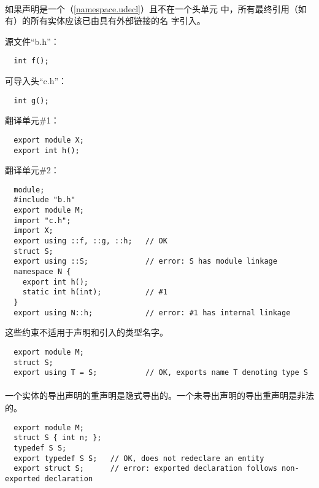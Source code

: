 \paragraph{} %
如果声明是一个（\ref{namespace.udecl}）且不在一个头单元
中，所有最终引用（如有）的所有实体应该已由具有外部链接的名
字引入。

\begin{example}

  源文件“b.h”：
  \begin{lstlisting}
  int f();
  \end{lstlisting}
  可导入头“c.h”：
  \begin{lstlisting}
  int g();
  \end{lstlisting}
  翻译单元\#1：
  \begin{lstlisting}
  export module X;
  export int h();
  \end{lstlisting}
  翻译单元\#2：
  \begin{lstlisting}
  module;
  #include "b.h"
  export module M;
  import "c.h";
  import X;
  export using ::f, ::g, ::h;   // OK
  struct S;
  export using ::S;             // error: S has module linkage
  namespace N {
    export int h();
    static int h(int);          // #1
  }
  export using N::h;            // error: #1 has internal linkage
  \end{lstlisting}
\end{example}

\begin{note}
  这些约束不适用于声明和引入的类型名字。
\end{note}

\begin{example}
  \begin{lstlisting}
  export module M;
  struct S;
  export using T = S;           // OK, exports name T denoting type S
  \end{lstlisting}
\end{example}

\paragraph{} %
一个实体的导出声明的重声明是隐式导出的。一个未导出声明的导出重声明是非法的。

\begin{example}
  \begin{lstlisting}
  export module M;
  struct S { int n; };
  typedef S S;
  export typedef S S;   // OK, does not redeclare an entity
  export struct S;      // error: exported declaration follows non-exported declaration
  \end{lstlisting}
\end{example}

